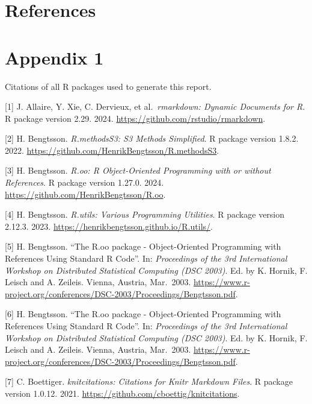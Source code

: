 \documentclass[
  12pt,
]{article}
\newlength{\cslhangindent}
\newlength{\cslentryspacingunit} %
\newenvironment{CSLReferences}[2] %
 {%
  \setlength{\parindent}{0pt}
  \ifodd #1
  \let\oldpar\par
  \def\par{\hangindent=\cslhangindent\oldpar}
  \fi
  \setlength{\parskip}{#2\cslentryspacingunit}
 }%
 {}
\begin{document}
\hypertarget{references}{%
\section{References}\label{references}}

\hypertarget{refs}{}
\begin{CSLReferences}{0}{0}
\end{CSLReferences}

\hypertarget{appendix-1}{%
\section{Appendix 1}\label{appendix-1}}

Citations of all R packages used to generate this report.

{[}1{]} J. Allaire, Y. Xie, C. Dervieux, et al.~\emph{rmarkdown: Dynamic
Documents for R}. R package version 2.29. 2024.
\url{https://github.com/rstudio/rmarkdown}.

{[}2{]} H. Bengtsson. \emph{R.methodsS3: S3 Methods Simplified}. R package
version 1.8.2. 2022. \url{https://github.com/HenrikBengtsson/R.methodsS3}.

{[}3{]} H. Bengtsson. \emph{R.oo: R Object-Oriented Programming with or without
References}. R package version 1.27.0. 2024.
\url{https://github.com/HenrikBengtsson/R.oo}.

{[}4{]} H. Bengtsson. \emph{R.utils: Various Programming Utilities}. R package
version 2.12.3. 2023. \url{https://henrikbengtsson.github.io/R.utils/}.

{[}5{]} H. Bengtsson. ``The R.oo package - Object-Oriented Programming with
References Using Standard R Code''. In: \emph{Proceedings of the 3rd
International Workshop on Distributed Statistical Computing (DSC
2003)}. Ed. by K. Hornik, F. Leisch and A. Zeileis. Vienna, Austria,
Mar.~2003.
\url{https://www.r-project.org/conferences/DSC-2003/Proceedings/Bengtsson.pdf}.

{[}6{]} H. Bengtsson. ``The R.oo package - Object-Oriented Programming with
References Using Standard R Code''. In: \emph{Proceedings of the 3rd
International Workshop on Distributed Statistical Computing (DSC
2003)}. Ed. by K. Hornik, F. Leisch and A. Zeileis. Vienna, Austria,
Mar.~2003.
\url{https://www.r-project.org/conferences/DSC-2003/Proceedings/Bengtsson.pdf}.

{[}7{]} C. Boettiger. \emph{knitcitations: Citations for Knitr Markdown Files}.
R package version 1.0.12. 2021.
\url{https://github.com/cboettig/knitcitations}.
\end{document}
